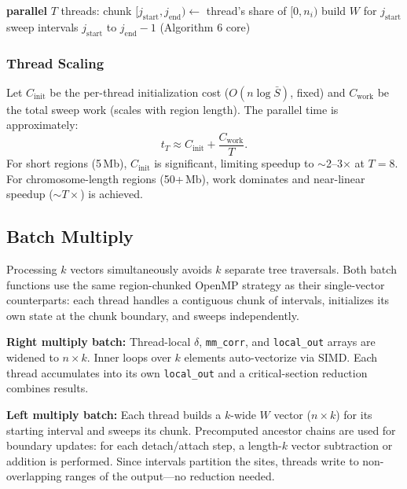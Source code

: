 \documentclass[11pt]{article}
\begin{document}
\begin{algorithmic}[1]
\State \textbf{parallel} $T$ threads:
\State \quad chunk $[j_\text{start}, j_\text{end}) \gets$ thread's share of $[0, n_i)$
\State \quad build $W$ for $j_\text{start}$
\State \quad sweep intervals $j_\text{start}$ to $j_\text{end} - 1$ (Algorithm 6 core)
\State \quad {}
\end{algorithmic}

\subsubsection{Thread Scaling}

Let $C_\text{init}$ be the per-thread initialization cost ($O(n \log
\bar{S})$, fixed) and $C_\text{work}$ be the total sweep work (scales with
region length).  The parallel time is approximately:
\[
t_T \approx C_\text{init} + \frac{C_\text{work}}{T}.
\]
For short regions (5\,Mb), $C_\text{init}$ is significant, limiting
speedup to $\sim$2--3$\times$ at $T = 8$.  For chromosome-length regions
(50+\,Mb), work dominates and near-linear speedup ($\sim$$T \times$) is
achieved.

\subsection{Batch Multiply}

Processing $k$ vectors simultaneously avoids $k$ separate tree traversals.
Both batch functions use the same region-chunked OpenMP strategy as their
single-vector counterparts: each thread handles a contiguous chunk of
intervals, initializes its own state at the chunk boundary, and sweeps
independently.

\textbf{Right multiply batch:}
Thread-local $\delta$, \texttt{mm\_corr}, and \texttt{local\_out} arrays
are widened to $n \times k$.  Inner loops over $k$ elements auto-vectorize
via SIMD.  Each thread accumulates into its own \texttt{local\_out} and
a critical-section reduction combines results.

\textbf{Left multiply batch:}
Each thread builds a $k$-wide $W$ vector ($n \times k$) for its starting
interval and sweeps its chunk.  Precomputed ancestor chains are used for
boundary updates: for each detach/attach step, a length-$k$ vector
subtraction or addition is performed.  Since intervals partition the sites,
threads write to non-overlapping ranges of the output---no reduction needed.
\end{document}
